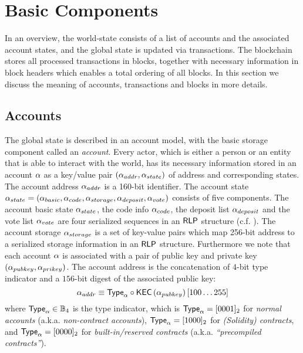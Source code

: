 

\section{Basic Components}
In an overview, the {\name} world-state consists of a list of accounts and the associated account states, and the global state is updated via transactions. 
The {\name} blockchain stores all processed transactions in blocks, together with necessary information in block headers which enables a total ordering of all blocks.
In this section we discuss the meaning of accounts, transactions and blocks in more details.


\subsection{Accounts}
\label{subsec:accounts}

The {\name} global state is described in an account model, with the basic storage component called an \emph{account}.
Every actor, which is either a person or an entity that is able to interact with the {\name} world, has its necessary information stored in an account $\mathbf{\alpha}$  as a key/value pair $(\mathbf{\alpha}_{addr}, \mathbf{\alpha}_{state})$ of address and corresponding states. 
The account address $\mathbf{\alpha}_{addr}$ is a 160-bit identifier. The account state $\mathbf{\alpha}_{state}= (\mathbf{\alpha}_{basic},\mathbf{\alpha}_{code}, \mathbf{\alpha}_{storage},\mathbf{\alpha}_{deposit},\mathbf{\alpha}_{vote})$ consists of five components. The account basic state $\mathbf{\alpha}_{state}$, the code info $\mathbf{\alpha}_{code}$, the deposit list $\mathbf{\alpha}_{deposit}$ and the vote list $\mathbf{\alpha}_{vote}$ are four serialized sequences in an $\mathsf{RLP}$ structure (c.f. \cite{ETH_yellow}). The account storage $\mathbf{\alpha}_{storage}$ is a set of key-value pairs which map 256-bit address to a serialized storage information in an $\mathsf{RLP}$ structure. 
Furthermore we note that each account $\mathbf{\alpha}$ is associated with a pair of public key and private key $\left(\mathbf{\alpha}_{pubkey}, \mathbf{\alpha}_{prikey}\right)$.
The account address is the concatenation of $4$-bit type indicator and a $156$-bit digest of the associated public key: 
\begin{equation}\label{eq:account-address}
	\mathbf{\alpha}_{addr} \equiv \mathsf{Type}_{\mathbf{\alpha}} \circ \mathsf{KEC} \left( \mathbf{\alpha}_{pubkey} \right)[100\dots 255]
\end{equation}
where $\mathsf{Type}_{\mathbf{\alpha}}\in \mathbb{B}_4$ is the type indicator,
which is $\mathsf{Type}_{\mathbf{\alpha}}=[0001]_2$ for \emph{normal accounts} (a.k.a. \emph{non-contract accounts}), $\mathsf{Type}_{\mathbf{\alpha}}=[1000]_2$ for \emph{(Solidity) contracts},
and $\mathsf{Type}_{\mathbf{\alpha}}=[0000]_2$ for \emph{built-in/reserved contracts} (a.k.a. \emph{``precompiled contracts''}).


